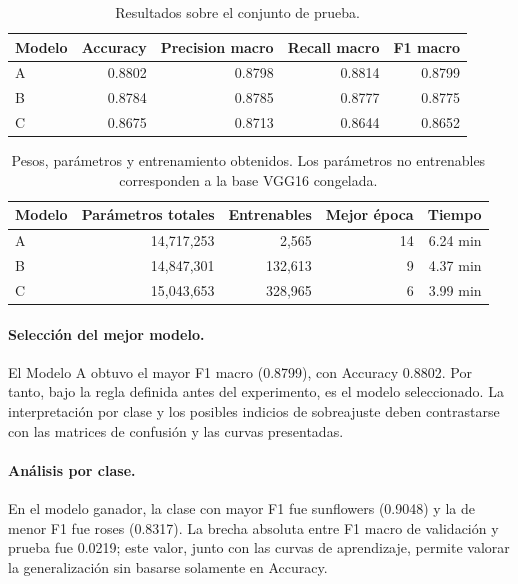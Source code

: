 \begin{table}[H]
\centering
\caption{Resultados sobre el conjunto de prueba.}
\label{tab:resultados}
\begin{tabular}{lrrrr}
\toprule
Modelo & Accuracy & Precision macro & Recall macro & F1 macro\\
\midrule
A & 0.8802 & 0.8798 & 0.8814 & 0.8799 \\
B & 0.8784 & 0.8785 & 0.8777 & 0.8775 \\
C & 0.8675 & 0.8713 & 0.8644 & 0.8652 \\
\bottomrule
\end{tabular}
\end{table}

\begin{table}[H]
\centering
\caption{Pesos, parámetros y entrenamiento obtenidos. Los parámetros no
entrenables corresponden a la base VGG16 congelada.}
\label{tab:pesos}
\begin{tabular}{lrrrr}
\toprule
Modelo & Parámetros totales & Entrenables & Mejor época & Tiempo\\
\midrule
A & 14,717,253 & 2,565 & 14 & 6.24 min \\
B & 14,847,301 & 132,613 & 9 & 4.37 min \\
C & 15,043,653 & 328,965 & 6 & 3.99 min \\
\bottomrule
\end{tabular}
\end{table}

\paragraph{Selección del mejor modelo.}
El Modelo A obtuvo el mayor F1 macro (0.8799), con Accuracy 0.8802. Por tanto, bajo la regla definida antes del experimento, es el modelo seleccionado. La interpretación por clase y los posibles indicios de sobreajuste deben contrastarse con las matrices de confusión y las curvas presentadas.

\paragraph{Análisis por clase.} En el modelo ganador, la clase con mayor F1 fue sunflowers (0.9048) y la de menor F1 fue roses (0.8317). La brecha absoluta entre F1 macro de validación y prueba fue 0.0219; este valor, junto con las curvas de aprendizaje, permite valorar la generalización sin basarse solamente en Accuracy.
